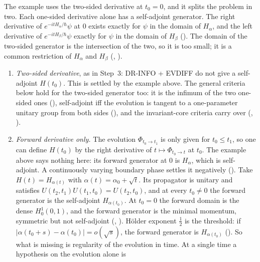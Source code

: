 \documentclass[11pt]{article}
\begin{document}
\begin{enumerate}
  The example uses the two-sided derivative at $t_0 = 0$, and it splits the problem in two.
  Each one-sided derivative alone has a self-adjoint generator. The right derivative of
  $e^{-itH_\alpha/\hbar}\psi$ at $0$ exists exactly for $\psi$ in the domain of $H_\alpha$, and the
  left derivative of $e^{-itH_\beta/\hbar}\psi$ exactly for $\psi$ in the domain of $H_\beta$
  (). The domain of the two-sided generator is the
  intersection of the two, so it is too small; it is a common restriction of $H_\alpha$ and $H_\beta$
  (, ).
  \begin{enumerate}
  \item[(a)] \emph{Two-sided derivative}, as in Step~3: DR-INFO + EVDIFF do not give a
    self-adjoint $H(t_0)$. This is settled by the example above. The general criteria below
    hold for the two-sided generator too: it is the infimum of the two one-sided ones
    (), self-adjoint iff the evolution is tangent to a
    one-parameter unitary group from both sides (),
    and the invariant-core criteria carry over
    (,
    ).
  \item[(b)] \emph{Forward derivative only.} The evolution $\Phi_{t_0\to t_1}$ is only given
    for $t_0 \le t_1$, so one can define $H(t_0)$ by the right derivative of
    $t \mapsto \Phi_{t_0\to t}$ at $t_0$. The example above says nothing here: its forward
    generator at $0$ is $H_\alpha$, which is self-adjoint. A continuously varying boundary
    phase settles it negatively (). Take
    $H(t) = H_{\alpha(t)}$ with $\alpha(t) = \alpha_0 + \sqrt t$. Its propagator is unitary
    and satisfies $U(t_2,t_1)U(t_1,t_0) = U(t_2,t_0)$, and at every $t_0 \ne 0$ the forward
    generator is the self-adjoint $H_{\alpha(t_0)}$. At $t_0 = 0$ the forward domain is the
    dense $H^1_0(0,1)$, and the forward generator is the minimal momentum, symmetric but not
    self-adjoint (,
    ). Hölder exponent $\tfrac12$ is the
    threshold: if $|\alpha(t_0+s) - \alpha(t_0)| = o(\sqrt s)$, the forward generator is
    $H_{\alpha(t_0)}$ (). So what is missing is regularity
    of the evolution in time. At a single time a hypothesis on the evolution alone is

\end{enumerate}
\end{enumerate}
\end{document}
